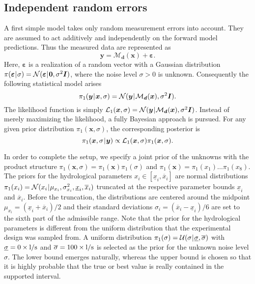 \subsection{Independent random errors}
A first simple model takes only random measurement errors into account.
They are assumed to act additively and independently on the forward model predictions.
Thus the measured data are represented as
\begin{equation} \label{eq:Hydro:Simple:NoisyData}
  \bm{y} = \mathcal{M}_{\bm{d}}(\bm{x}) + \bm{\varepsilon}.
\end{equation}
Here, \(\bm{\varepsilon}\) is a realization of a random vector with a Gaussian distribution
\(\pi(\bm{\varepsilon} {\:\!}|{\:\!} \sigma) = \mathcal{N}(\bm{\varepsilon} {\:\!}|{\:\!} \bm{0},\sigma^2 \bm{I})\), where the noise level \(\sigma > 0\) is unknown.
Consequently the following statistical model arises
\begin{equation} \label{eq:Hydro:Simple:RandomData}
  \pi_1(\bm{y} {\:\!}|{\:\!} \bm{x},\sigma) = \mathcal{N}(\bm{y} {\:\!}|{\:\!} \mathcal{M}_{\bm{d}}(\bm{x}), \sigma^2 \bm{I}).
\end{equation}
The likelihood function is simply \(\mathcal{L}_1(\bm{x},\sigma) = \mathcal{N}(\bm{y} {\:\!}|{\:\!} \mathcal{M}_{\bm{d}}(\bm{x}), \sigma^2 \bm{I})\).
Instead of merely maximizing the likelihood, a fully Bayesian approach is pursued.
For any given prior distribution \(\pi_1(\bm{x},\sigma)\), the corresponding posterior is
\begin{equation} \label{eq:Hydro:Simple:Posterior}
  \pi_1(\bm{x},\sigma {\:\!}|{\:\!} \bm{y}) \propto \mathcal{L}_1(\bm{x},\sigma) \pi_1(\bm{x},\sigma).
\end{equation}
\par %
In order to complete the setup, we specify a joint prior of the unknowns with the product structure
\(\pi_1(\bm{x},\sigma) = \pi_1(\bm{x}) \pi_1(\sigma)\) and \(\pi_1(\bm{x}) = \pi_1(x_1) \ldots \pi_1(x_8)\).
The priors for the hydrological parameters \(x_i \in [\underline{x}_i,\overline{x}_i]\) are normal distributions
\(\pi_1(x_i) = \mathcal{N}(x_i {\:\!}|{\:\!} \mu_{x_i},\sigma_{x_i}^2,\underline{x}_i,\overline{x}_i)\)
truncated at the respective parameter bounds \(\underline{x}_i\) and \(\overline{x}_i\).
Before the truncation, the distributions are centered around the midpoint \(\mu_{x_i} = (\underline{x}_i+\overline{x}_i)/2\)
and their standard deviations \(\sigma_i = (\overline{x}_i-\underline{x}_i)/6\) are set to the sixth part of the admissible range.
Note that the prior for the hydrological parameters is different from the uniform distribution that the experimental design was sampled from.
A uniform distribution \(\pi_1(\sigma) = \mathcal{U}(\sigma {\:\!}|{\:\!} \underline{\sigma},\overline{\sigma})\) with \(\underline{\sigma} = 0 \times \unit[]{l/s}\)
and \(\overline{\sigma} = 100 \times \unit[]{l/s}\) is selected as the prior for the unknown noise level \(\sigma\).
The lower bound emerges naturally, whereas the upper bound is chosen so that it is highly probable that the true or best value is really contained in the supported interval.


